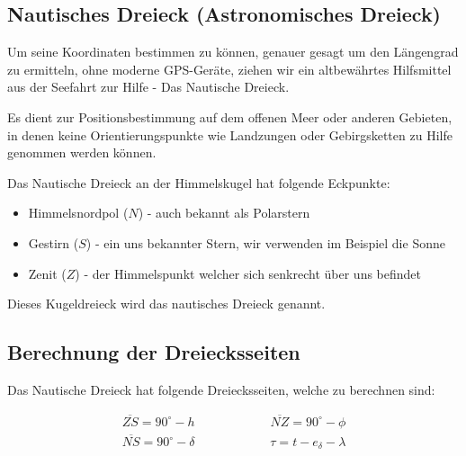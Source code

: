\begin{refsection}
\section{Nautisches Dreieck (Astronomisches Dreieck)}
Um seine Koordinaten bestimmen zu können, genauer gesagt um den Längengrad zu ermitteln, ohne moderne GPS-Geräte, ziehen wir ein altbewährtes Hilfsmittel aus der Seefahrt zur Hilfe - Das Nautische Dreieck.

Es dient zur Positionsbestimmung auf dem offenen Meer oder anderen Gebieten, in denen keine Orientierungspunkte wie Landzungen oder Gebirgsketten zu Hilfe genommen werden können.

Das Nautische Dreieck an der Himmelskugel hat folgende Eckpunkte:
\begin{itemize}
\item Himmelsnordpol ($N$) - auch bekannt als Polarstern
\item Gestirn ($S$) - ein uns bekannter Stern, wir verwenden im Beispiel die Sonne
\item Zenit ($Z$) - der Himmelspunkt welcher sich senkrecht über uns befindet
\end{itemize}

Dieses Kugeldreieck wird das nautisches Dreieck genannt.


\subsection{Berechnung der Dreiecksseiten}
Das Nautische Dreieck hat folgende Dreiecksseiten, welche zu berechnen sind:

\begin{align*}
\overline{ZS} = 90^{\circ} - h \quad \quad \quad \quad \quad \quad 
\overline{NZ} = 90^{\circ} - \phi \\
\overline{NS} = 90^{\circ} - \delta \quad \quad \quad \quad \quad \quad 
\tau = t - e_\delta - \lambda 
\end{align*}



\end{refsection}

